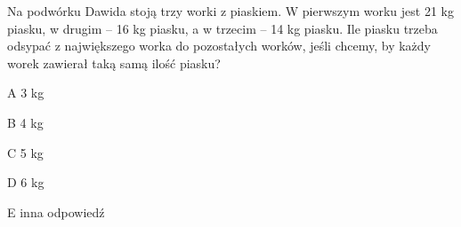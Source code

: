 \begin{tresc}
Na podwórku Dawida stoją trzy worki z piaskiem. W pierwszym worku jest 21 kg piasku, w drugim – 16 kg piasku, a w trzecim – 14 kg piasku. Ile piasku trzeba odsypać z największego worka do pozostałych worków, jeśli chcemy, by każdy worek zawierał taką samą ilość piasku?
\end{tresc}
\begin{wariant}{A} 3 kg \end{wariant}
\begin{wariant}{B} 4 kg \end{wariant}
\begin{wariant}{C} 5 kg \end{wariant}
\begin{wariant}{D} 6 kg \end{wariant}
\begin{wariant}{E} inna odpowiedź \end{wariant}
